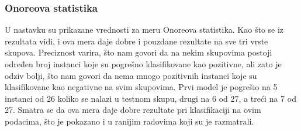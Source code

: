 \documentclass[12pt,oneside]{memoir}
\begin{document}
\subsubsection{Onoreova statistika}
U nastavku su prikazane vrednosti za meru Onoreova statistika.  Kao što se iz rezultata vidi,  i ova mera daje dobre i pouzdane rezultate na sve tri vrste skupova. Preciznost varira, što nam govori da na nekim skupovima postoji određen broj instanci koje su pogrešno klasifikovane kao pozitivne, ali zato je odziv bolji,  što nam govori da nema mnogo pozitivnih instanci koje su klasifikovane kao negativne na svim skupovima.  Prvi model je pogrešio na 5 instanci od 26 koliko se nalazi u testnom skupu, drugi na 6 od 27, a treći na 7 od 27.   Smatra se da ova mera daje dobre rezultate pri klasifikaciji na ovim podacima, što je pokazano i u ranijim radovima koji su je razmatrali.  
\newline
\newline
\noindent{}
\newline
\newline
\end{document}
